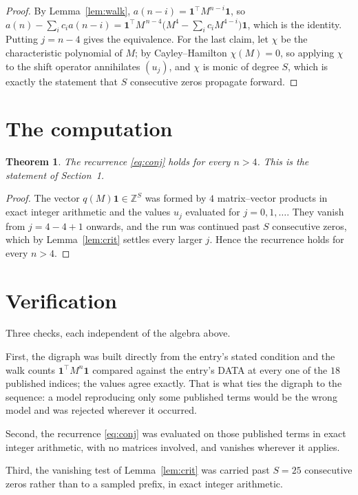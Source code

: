 \documentclass[11pt,a4paper]{article}
\theoremstyle{plain}
\newtheorem{theorem}{Theorem}
\theoremstyle{definition}
\begin{document}
\begin{proof}
By Lemma~\ref{lem:walk}, $a(n-i)=\mathbf{1}^{\!\top}M^{n-i}\mathbf{1}$, so
$a(n)-\sum_i c_i a(n-i)
=\mathbf{1}^{\!\top}M^{\,n-4}\bigl(M^{4}-\sum_i c_i M^{4-i}\bigr)
\mathbf{1}$, which is the identity. Putting $j=n-4$ gives the equivalence. For the
last claim, let $\chi$ be the characteristic polynomial of $M$; by Cayley--Hamilton
$\chi(M)=0$, so applying $\chi$ to the shift operator annihilates $(u_j)$, and $\chi$ is
monic of degree $S$, which is exactly the statement that $S$ consecutive zeros propagate
forward.
\end{proof}

\section{The computation}

\begin{theorem}
The recurrence \eqref{eq:conj} holds for every $n>4$. This is the statement of
Section~1.
\end{theorem}

\begin{proof}
The vector $q(M)\mathbf{1}\in\mathbb{Z}^{S}$ was formed by $4$ matrix--vector
products in exact integer arithmetic and the values $u_j$ evaluated for
$j=0,1,\dots$. They vanish from $j=4-4+1$ onwards, and the run was continued past
$S$ consecutive zeros, which by Lemma~\ref{lem:crit} settles every larger $j$. Hence the
recurrence holds for every $n>4$.
\end{proof}

\section{Verification}

Three checks, each independent of the algebra above.

First, the digraph was built directly from the entry's stated condition and the walk counts
$\mathbf{1}^{\!\top}M^{n}\mathbf{1}$ compared against the entry's DATA at every one of
the $18$ published indices; the values agree exactly. That is what ties the digraph to
the sequence: a model reproducing only some published terms would be the wrong model and
was rejected wherever it occurred.

Second, the recurrence \eqref{eq:conj} was evaluated on those published terms in exact
integer arithmetic, with no matrices involved, and vanishes wherever it applies.

Third, the vanishing test of Lemma~\ref{lem:crit} was carried past $S=25$ consecutive
zeros rather than to a sampled prefix, in exact integer arithmetic.
\end{document}
